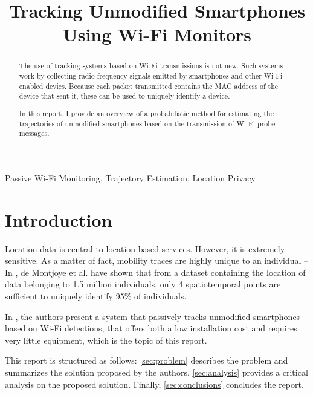 \documentclass[conference]{IEEEtran}
\begin{document}
\title{\huge Tracking Unmodified Smartphones Using Wi-Fi Monitors}

\author{
}

\maketitle

\begin{abstract}
The use of tracking systems based on Wi-Fi transmissions is not new. Such 
systems work by collecting radio frequency signals emitted by smartphones and 
other Wi-Fi enabled devies. Because each packet transmitted contains the MAC 
address of the device that sent it, these can be used to uniquely identify a 
device.

In this report, I provide an overview of a probabilistic method for estimating 
the trajectories of unmodified smartphones based on the transmission of Wi-Fi 
probe messages.\\
\end{abstract}

\begin{IEEEkeywords}
Passive Wi-Fi Monitoring, Trajectory Estimation, Location Privacy
\end{IEEEkeywords}

\section{Introduction}

Location data is central to location based services. However, it is extremely 
sensitive. As a matter of fact, mobility traces are highly unique to an 
individual -- In \cite{deMontjoye2013UniqueIT}, de Montjoye et al. have shown 
that from a dataset containing the location of data belonging to 1.5 million 
individuals, only 4 spatiotemporal points are sufficient to uniquely identify 
95\% of individuals.

In \cite{10.1145/2426656.2426685}, the authors present a system that passively 
tracks unmodified smartphones based on Wi-Fi detections, that offers both a low 
installation cost and requires very little equipment, which is the topic of 
this report.

This report is structured as follows: \cref{sec:problem} describes the problem 
and summarizes the solution proposed by the authors. \cref{sec:analysis} 
provides a critical analysis on the proposed solution. Finally, 
\cref{sec:conclusions} concludes the report.
\end{document}
